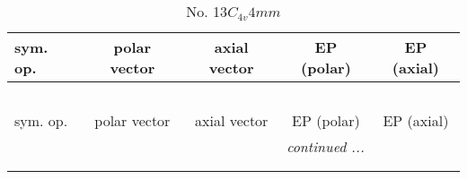 \documentclass[fleqn,10pt,landscape]{jsarticle}
\begin{document}
\begin{center}
\renewcommand{\arraystretch}{1.3}
\begin{longtable}{lcccc}
\caption{No. 13\quad$C_{4v}$\quad$4mm$\quad[ tetragonal ]}
 \\
 \hline \hline
sym. op. & polar vector & axial vector & EP (polar) & EP (axial) \\ \hline \endfirsthead

\multicolumn{4}{l}{\tablename\ \thetable{}} \\
 \hline \hline
sym. op. & polar vector & axial vector & EP (polar) & EP (axial) \\ \hline \endhead

 \hline \hline
\multicolumn{4}{r}{\footnotesize\it continued ...} \\ \endfoot

 \hline \hline
\multicolumn{4}{r}{} \\ \endlastfoot


\end{longtable}
\end{center}
\end{document}
